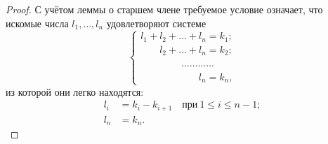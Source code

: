 \documentclass[a4paper,10pt]{amsart}
\theoremstyle{definition}
\theoremstyle{remark}
\begin{document}
\begin{proof}
	С учётом леммы о старшем члене требуемое условие означает, что
	искомые числа $l_1, \ldots, l_n$ удовлетворяют системе
	$$
	\begin{cases}
	l_1 + l_2 + \ldots + l_n = k_1; \\
	\phantom{l_1 + {}} l_2 + \ldots + l_n = k_2;\\
	\phantom{l_1 + l_2 + .} \ldots\ldots\ldots\ldots\\
	\phantom{l_1 + l_s + \ldots + {}} l_n = k_n,
	\end{cases}
	$$
	из которой они легко находятся:
	\begin{align*}
		l_i &= k_i - k_{i+1} \quad \text{при} \ 1 \leqslant i \leqslant n-1; \\
		l_n &= k_n.
	\end{align*}
\end{proof}
\end{document}
